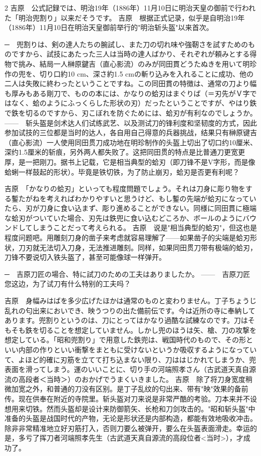 \documentclass[12pt,UTF8]{ctexbook}
\begin{document}
\begin{paracol}{2}
吉原　公式記録では、明治19年（1886年）11月10日に明治天皇の御前で行われた「明治兜割り」以来だそうです。
\switchcolumn*
吉原　根据正式记录，似乎是自明治19年（1886年）11月10日在明治天皇御前举行的"明治斩头盔"以来首次。
\switchcolumn*

─　兜割りは、剣の達人たちの腕試し、また刀の切れ味や強靭さを試すためのものですから、試技にあたった三人は当時の達人ばかり、それぞれが頼みとする得物で挑み、結局一人榊原鍵吉（直心影流）のみが同田貫どうたぬきを用いて明珍作の兜を、切り口約10 cm、深さ約1.5 cmの斬り込みを入れることに成功、他の二人は失敗に終わったということですね。この同田貫の特徴は、通常の刀より幅も厚みもある剛刀で、ものの本には、かなりの蛤刃はまぐりば（＝刃先がＶ字ではなく、蛤のようにふっくらした形状の刃）だったということですが、やはり鉄で鉄を切るのですから、刃こぼれを防ぐためには、蛤刃が有利なのでしょうか。
\switchcolumn*
——　斩头盔是剑术达人们试练武艺、以及测试刀的锋利度和坚韧度的方式，因此参加试技的三位都是当时的达人，各自用自己得意的兵器挑战，结果只有榊原键吉（直心影流）一人使用同田贯刀成功地在明珍制作的头盔上切出了切口约10厘米、深约1.5厘米的斩痕，另外两人都失败了。这把同田贯的特点是比普通刀更宽更厚，是一把刚刀。据书上记载，它是相当典型的蛤刃（即刀锋不是V字形，而是像蛤蜊一样鼓起的形状）。毕竟是铁切铁，为了防止崩刃，蛤刃是否更有利呢？
\switchcolumn*

吉原　「かなりの蛤刃」といっても程度問題でしょう。それは刀身に彫り物をする鏨たがねを考えればわかりやすいと思うけど、もし鏨の先端が蛤刃になっていたら、刃が刀身に食い込まず、彫り進めることができない。同様に同田貫に極端な蛤刃がついていた場合、刃先は鉄兜に食い込むどころか、ボールのようにバウンドしてしまうことだって考えられる。
\switchcolumn*
吉原　说是"相当典型的蛤刃"，但这也是程度问题吧。用雕刻刀身的凿子来考虑就容易理解了——如果凿子的尖端是蛤刃形状，刀刃就无法切入刀身，无法推进雕刻。同样，如果同田贯刀带有极端的蛤刃，刀锋不要说切入铁头盔了，甚至可能像球一样弹开。
\switchcolumn*

─　吉原刀匠の場合、特に試刀のための工夫はありましたか。
\switchcolumn*
——　吉原刀匠您这边，为了试刀有什么特别的工夫吗？
\switchcolumn*

吉原　身幅みはばを多少広げたほかは通常のものと変わりません。丁子ちょうじ乱れの匂出来においでき、映うつりの出た備前伝です。今は近所の寺に奉納してあります。兜割りというのは、刀にとってはかなり過酷な試練なのです。刀はそもそも鉄を切ることを想定していません。しかし兜のほうは矢、槍、刀の攻撃を想定している。「昭和兜割り」で用意した鉄兜は、戦国時代のもので、その形といい内部の作りといい衝撃をまともに受けないというか吸収するようになっていて、よほど的確に刃筋を立てて打ち込まない限り、刀ははじかれてしまうか、兜表面を滑ってしまう。運のいいことに、切り手の河端照孝さん（古武道天真自源流の高段者＜当時＞）のおかげでうまくいきました。
\switchcolumn*
吉原　除了将刀身宽度稍微加宽之外，和普通的刀没有区别。是丁子乱纹的匂出来、带有"映"效果的备前传。现在供奉在附近的寺院里。斩头盔对刀来说是非常严酷的考验。刀本来并不设想用来切铁。然而头盔却是设计来防御箭矢、长枪和刀剑攻击的。"昭和斩头盔"中准备的头盔是战国时代的产物，无论是形状还是内部构造，都能有效地吸收冲击。除非非常精准地立好刃筋打入，否则刀要么被弹开，要么在头盔表面滑走。幸运的是，多亏了挥刀者河端照孝先生（古武道天真自源流的高段位者<当时>），才成功了。
\end{paracol}
\end{document}
